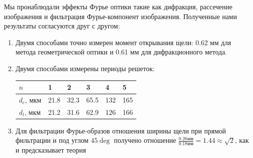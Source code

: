 \documentclass[a4paper, 12pt]{article}
\begin{document}
Мы пронаблюдали эффекты Фурье оптики такие как дифракция, рассечение изображения и фильтрация Фурье-компонент изображения.
Полученные нами результаты согласуются друг с другом:
\begin{enumerate}
    \item Двумя способами точно измерен момент открывания щели: 0.62 мм для метода геометрической оптики и 0.61 мм для дифракционного метода.
    \item Двумя способами измерены периоды решеток:
    \begin{table}[h]
        \centering
        \begin{tabular}{|l|l|l|l|l|l|}
        \hline
        $n$        & 1    & 2    & 3    & 4   & 5   \\ \hline
        $d_c$, мкм & 21.8 & 32.3 & 65.5 & 132 & 165 \\ \hline
        $d_l$, мкм & 21.2 & 31.6 & 62.9 & 126 & 166 \\ \hline
        \end{tabular}
    \end{table}
    \item Для фильтрации Фурье-образов отношения ширины щели при прямой фильтрации и под углом $45\deg$ получено отношение $\frac{0.26\text{мм}}{0.18\text{мм}} = 1.44 \approx \sqrt{2}$, как и предсказывает теория
\end{enumerate}
\end{document}
